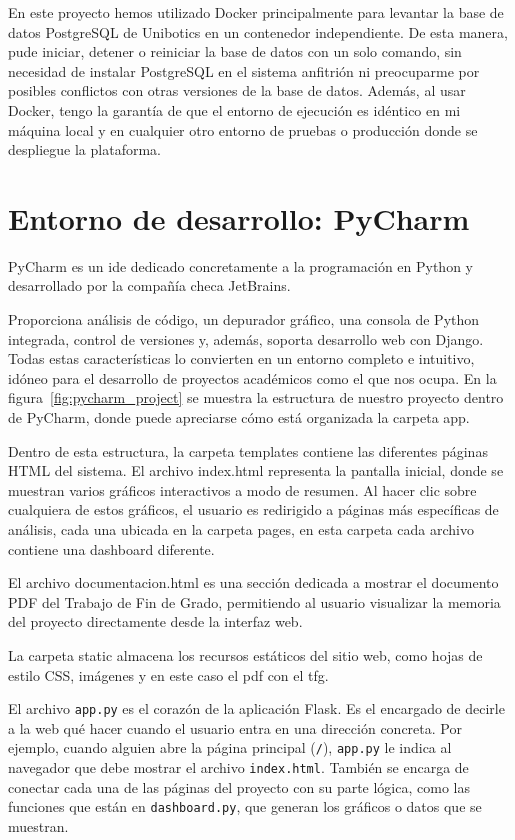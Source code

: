 \documentclass[a4paper, 12pt]{book}
\begin{document}
En este proyecto hemos utilizado Docker principalmente para levantar la base de datos PostgreSQL de Unibotics en un contenedor independiente. De esta manera, pude iniciar, detener o reiniciar la base de datos con un solo comando, sin necesidad de instalar PostgreSQL en el sistema anfitrión ni preocuparme por posibles conflictos con otras versiones de la base de datos. Además, al usar Docker, tengo la garantía de que el entorno de ejecución es idéntico en mi máquina local y en cualquier otro entorno de pruebas o producción donde se despliegue la plataforma.


\section{Entorno de desarrollo: PyCharm}
\label{sec:entorno_de_desarrollo}

PyCharm es un \gls{ide} dedicado concretamente a la programación en Python y desarrollado por la compañía checa JetBrains.

Proporciona análisis de código, un depurador gráfico, una consola de Python integrada, control de versiones y, además, soporta desarrollo web con Django. Todas estas características lo convierten en un entorno completo e intuitivo, idóneo para el desarrollo de proyectos académicos como el que nos ocupa. En la figura~\ref{fig:pycharm_project} se muestra la estructura de nuestro proyecto dentro de PyCharm, donde puede apreciarse cómo está organizada la carpeta app.

Dentro de esta estructura, la carpeta templates contiene las diferentes páginas HTML del sistema. El archivo index.html representa la pantalla inicial, donde se muestran varios gráficos interactivos a modo de resumen. Al hacer clic sobre cualquiera de estos gráficos, el usuario es redirigido a páginas más específicas de análisis, cada una ubicada en la carpeta pages, en esta carpeta cada archivo contiene una dashboard diferente.

El archivo documentacion.html es una sección dedicada a mostrar el documento PDF del Trabajo de Fin de Grado, permitiendo al usuario visualizar la memoria del proyecto directamente desde la interfaz web.

La carpeta static almacena los recursos estáticos del sitio web, como hojas de estilo CSS, imágenes y en este caso el pdf con el tfg.

El archivo \texttt{app.py} es el corazón de la aplicación Flask. Es el encargado de decirle a la web qué hacer cuando el usuario entra en una dirección concreta. Por ejemplo, cuando alguien abre la página principal (\texttt{/}), \texttt{app.py} le indica al navegador que debe mostrar el archivo \texttt{index.html}. También se encarga de conectar cada una de las páginas del proyecto con su parte lógica, como las funciones que están en \texttt{dashboard.py}, que generan los gráficos o datos que se muestran.
\end{document}
